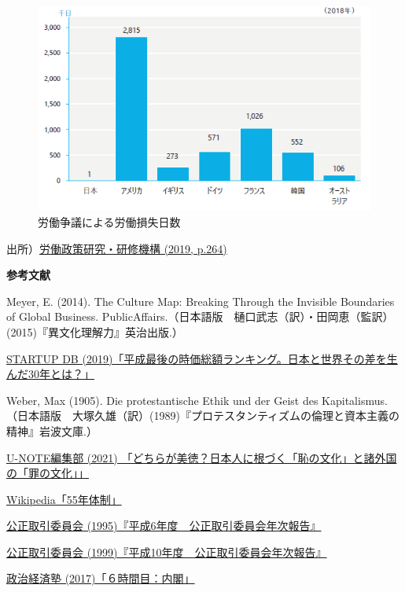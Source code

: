 \documentclass[
]{book}
\begin{document}
\begin{figure}
\includegraphics[width=960px]{strike} \caption{労働争議による労働損失日数}\label{fig:strike}
\end{figure}

出所）\href{https://www.jil.go.jp/kokunai/statistics/databook/2019/07/d2019_G7-2.pdf}{労働政策研究・研修機構 (2019, p.264)}

{\textbf{参考文献}}

Meyer, E. (2014). The Culture Map: Breaking Through the Invisible Boundaries of Global Business. PublicAffairs.（日本語版　樋口武志（訳）・田岡恵（監訳）(2015)『異文化理解力』英治出版.）

\href{https://media.startup-db.com/research/marketcap-global}{STARTUP DB (2019)「平成最後の時価総額ランキング。日本と世界その差を生んだ30年とは？」}

Weber, Max (1905). Die protestantische Ethik und der Geist des Kapitalismus. （日本語版　大塚久雄（訳）(1989)『プロテスタンティズムの倫理と資本主義の精神』岩波文庫.）

\href{https://u-note.me/note/47506034}{U-NOTE編集部 (2021) 「どちらが美徳？日本人に根づく「恥の文化」と諸外国の「罪の文化」」}

\href{https://ja.wikipedia.org/wiki/55\%E5\%B9\%B4\%E4\%BD\%93\%E5\%88\%B6}{Wikipedia「55年体制」}

\href{https://www.jftc.go.jp/info/nenpou/h06/02070002.html}{公正取引委員会 (1995)『平成6年度　公正取引委員会年次報告』}

\href{https://www.jftc.go.jp/info/nenpou/h10/02070001.html}{公正取引委員会 (1999)『平成10年度　公正取引委員会年次報告』}

\href{https://www.seijikeizaijuku.com/naikaku.html}{政治経済塾 (2017)「６時間目：内閣」}
\end{document}
